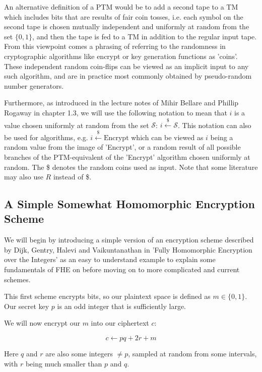 An alternative definition of a PTM would be to add a second tape to a TM which includes bits that are results of fair coin tosses, i.e. each symbol on the second tape is chosen mutually independent and uniformly at random from the set $\{ 0, 1 \}$, and then the tape is fed to a TM in addition to the regular input tape. From this viewpoint comes a phrasing of referring to the randomness in cryptographic algorithms like encrypt or key generation functions as 'coins'. These independent random coin-flips can be viewed as an implicit input to any such algorithm, and are in practice most commonly obtained by pseudo-random number generators.

Furthermore, as introduced in the lecture notes of Mihir Bellare and Phillip Rogaway \cite{bellare_introduction_2005} in chapter 1.3, we will use the following notation to mean that $i$ is a value chosen uniformly at random from the set $\mathcal{S}$: $i \xleftarrow{\$} \mathcal{S}$. This notation can also be used for algorithms, e.g. $i \xleftarrow{\$} \text{Encrypt}$ which can be viewed as $i$ being a random value from the image of 'Encrypt', or a random result of all possible branches of the PTM-equivalent of the 'Encrypt' algorithm chosen uniformly at random. The \$ denotes the random coins used as input. Note that some literature may also use $R$ instead of \$.

\subsection{A Simple Somewhat Homomorphic Encryption Scheme}

We will begin by introducing a simple version of an encryption scheme described by Dijk, Gentry, Halevi and Vaikuntanathan in 'Fully Homomorphic Encryption over the Integers' \cite{van_dijk_fully_2010} as an easy to understand example to explain some fundamentals of FHE on before moving on to more complicated and current schemes.

This first scheme encrypts bits, so our plaintext space is defined as $m \in \{ 0, 1 \}$. Our secret key $p$ is an odd integer that is sufficiently large.

We will now encrypt our $m$ into our ciphertext $c$:

\begin{equation}
    c \leftarrow p q + 2 r + m
    \label{eq:dijk_encryption}
\end{equation}

Here $q$ and $r$ are also some integers $\neq p$, sampled at random from some intervals, with $r$ being much smaller than $p$ and $q$.

